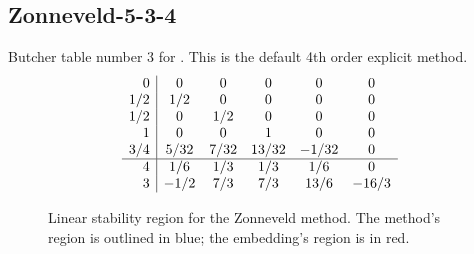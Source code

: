 \documentclass[letterpaper,10pt,english]{sphinxmanual}
\begin{document}
\subsection{Zonneveld-5-3-4}
\label{Butcher:butcher-zonneveld}\label{Butcher:zonneveld-5-3-4}
Butcher table number 3
for {\hyperref[c_interface/User_callable:c.ARKodeSetERKTableNum]{\emph{}}}.  This is
the default 4th order explicit method.
\begin{gather}
\begin{split}\begin{array}{r|ccccc}
    0 & 0 & 0 & 0 & 0 & 0 \\
  1/2 & 1/2 & 0 & 0 & 0 & 0 \\
  1/2 & 0 & 1/2 & 0 & 0 & 0 \\
    1 & 0 & 0 & 1 & 0 & 0 \\
  3/4 & 5/32 & 7/32 & 13/32 & -1/32 & 0 \\
  \hline
  4 & 1/6 & 1/3 & 1/3 & 1/6 & 0 \\
  3 & -1/2 & 7/3 & 7/3 & 13/6 & -16/3
\end{array}\end{split}\notag
\end{gather}\begin{figure}[htbp]
\centering
\capstart

\caption{Linear stability region for the Zonneveld method.  The method's
region is outlined in blue; the embedding's region is in red.}\end{figure}
\end{document}
